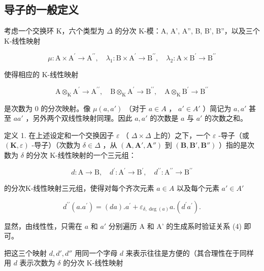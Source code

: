 \subsection{导子的一般定义}

考虑一个交换环 K，六个类型为 \(\Delta\) 的分次 K-模：A, A', A'', B, B', B''，以及三个 K-线性映射

\[
\mu \colon \mathrm{A} \times \mathrm{A} ^ {\prime} \rightarrow \mathrm{A} ^ {\prime \prime}, \quad \lambda_ {1} \colon \mathrm{B} \times \mathrm{A} ^ {\prime} \rightarrow \mathrm{B} ^ {\prime \prime}, \quad \lambda_ {2} \colon \mathrm{A} \times \mathrm{B} ^ {\prime} \rightarrow \mathrm{B} ^ {\prime \prime}
\]

使得相应的 K-线性映射

\[
\mathrm{A} \otimes_ {\mathrm{K}} \mathrm{A} ^ {\prime} \rightarrow \mathrm{A} ^ {\prime \prime}, \quad \mathrm{B} \otimes_ {\mathrm{K}} \mathrm{A} ^ {\prime} \rightarrow \mathrm{B} ^ {\prime \prime}, \quad \mathrm{A} \otimes_ {\mathrm{K}} \mathrm{B} ^ {\prime} \rightarrow \mathrm{B} ^ {\prime \prime}
\]

是次数为 0 的分次映射。像 \(\mu(a, a')\) （对于 \(a \in A\) ， \(a' \in A'\) ）简记为 \(a, a'\) 甚至 \(aa'\) ，另外两个双线性映射同理。因此 \(a, a'\) 的次数是 \(a\) 与 \(a'\) 的次数之和。

定义 1. 在上述设定和一个交换因子 \(\varepsilon\) （ \(\Delta \times \Delta\) 上的）之下，一个 \(\varepsilon\) -导子（或 \((\mathbf{K}, \varepsilon)\) -导子）（次数为 \(\delta \in \Delta\) ，从 \((\mathbf{A}, \mathbf{A}', \mathbf{A}'')\) 到 \((\mathbf{B}, \mathbf{B}', \mathbf{B}'')\) ）指的是次数为 \(\delta\) 的分次 K-线性映射的一个三元组：

\[
d \colon \mathrm{A} \rightarrow \mathrm{B}, \quad d ^ {\prime} \colon \mathrm{A} ^ {\prime} \rightarrow \mathrm{B} ^ {\prime}, \quad d ^ {\prime \prime} \colon \mathrm{A} ^ {\prime \prime} \rightarrow \mathrm{B} ^ {\prime \prime}
\]

的分次K-线性映射三元组，使得对每个齐次元素 \(a \in A\) 以及每个元素 \(a' \in A'\)

\[
d ^ {\prime \prime} (a. a ^ {\prime}) = (d a). a ^ {\prime} + \varepsilon_ {\delta , \deg (a)} a. (d ^ {\prime} a ^ {\prime}).\tag{4}
\]

显然，由线性性，只需在 \(a\) 和 \(a'\) 分别遍历 A 和 A' 的生成系时验证关系 (4) 即可。

把这三个映射 \(d, d', d''\) 用同一个字母 \(d\) 来表示往往是方便的（其合理性在于同样用 \(d\) 表示次数为 \(\delta\) 的分次 K-线性映射

